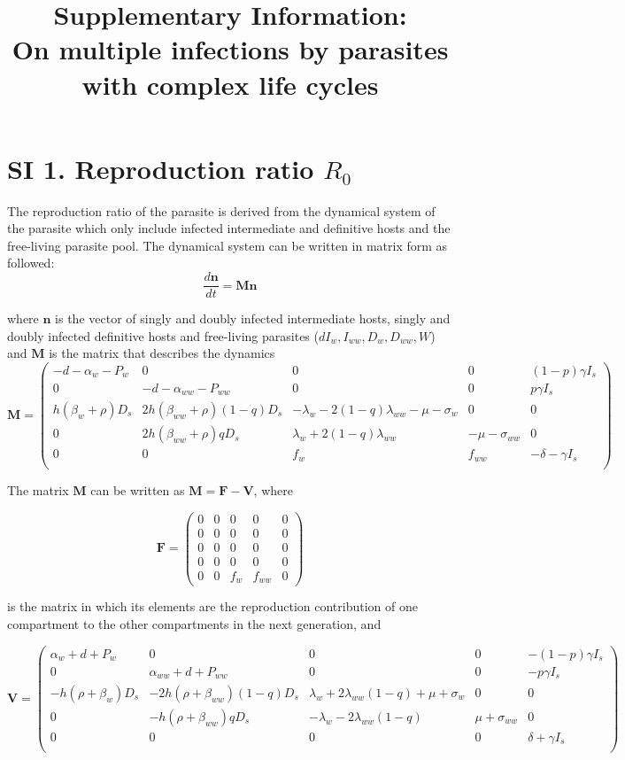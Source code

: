\documentclass[11pt]{article}
\title{Supplementary Information:\\ On multiple infections by parasites with complex life cycles}
\date{}
\begin{document}
\maketitle

\section*{SI 1. Reproduction ratio $R_0$}

The reproduction ratio of the parasite is derived from the dynamical system of the parasite which only include infected intermediate and definitive hosts and the free-living parasite pool. The dynamical system can be written in matrix form as followed:
\[
\frac{d \mathbf{n}}{dt} = \mathbf{M} \mathbf{n}
\]

where $\mathbf{n}$ is the vector of singly and doubly infected intermediate hosts, singly and doubly infected definitive hosts and free-living parasites ($dI_w, I_{ww}, D_w, D_{ww}, W$) and $\mathbf{M}$ is the matrix that describes the dynamics
\[ \mathbf{M} = 
\begin{pmatrix}
- d - \alpha_w - P_w & 0 & 0 & 0 & (1 - p) \gamma I_s \\
0 & -d - \alpha_{ww} - P_{ww} & 0 & 0 & p \gamma I_s \\
h (\beta_w + \rho ) D_s & 2 h (\beta_{ww} + \rho) (1-q) D_s &-\lambda_w - 2  (1-q)\lambda_{ww}  -\mu -\sigma_w & 0 & 0 \\
0 & 2 h (\beta_{ww} + \rho ) q D_s  & \lambda_w + 2 (1-q) \lambda_{ww}  & -\mu - \sigma_{ww} & 0 \\
 0 & 0 & f_w & f_{ww} &- \delta - \gamma I_s  \\
\end{pmatrix}
\]

The matrix $\mathbf{M}$ can be written as $\mathbf{M} = \mathbf{F} - \mathbf{V}$, where

\[
\mathbf{F} = 
\begin{pmatrix}
0 & 0 & 0 & 0 & 0  \\
0 & 0 & 0 & 0 & 0  \\
0 & 0 & 0 & 0 & 0  \\
0 & 0 & 0 & 0 & 0  \\
0 & 0 & f_w & f_{ww} & 0
\end{pmatrix}
\]

is the matrix in which its elements are the reproduction contribution of one compartment to the other compartments in the next generation, and

\[
\mathbf{V} = 
\begin{pmatrix}
\alpha_w + d + P_w  & 0 & 0 & 0 & - (1 - p) \gamma  I_s\\
 0 & \alpha_{ww} + d + P_{ww} & 0 & 0 & - p \gamma I_s \\
- h(\rho + \beta_w) D_s & -2 h(\rho + \beta_{ww})  (1 - q) D_s & \lambda_w + 2 \lambda_{ww} (1-q) + \mu + \sigma_w & 0 & 0 \\
 0 & -h (\rho + \beta_{ww}) q D_s  & -\lambda_w - 2 \lambda_{ww} (1 - q) & \mu + \sigma_{ww} & 0 \\
 0 & 0 & 0 & 0 & \delta + \gamma I_s \\
\end{pmatrix}
\]
\end{document}
